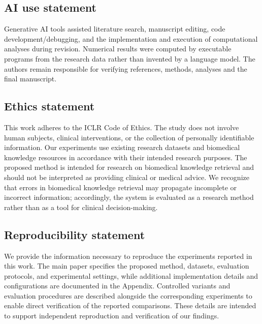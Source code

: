\documentclass{article} %
\begin{document}
\newpage
\subsection*{AI use statement}

Generative AI tools assisted literature search, manuscript editing, code development/debugging, and the implementation and execution of computational analyses during revision. Numerical results were computed by executable programs from the research data rather than invented by a language model. The authors remain responsible for verifying references, methods, analyses and the final manuscript.

\subsection*{Ethics statement}

This work adheres to the ICLR Code of Ethics. The study does not 
involve human subjects, clinical interventions, or the collection of 
personally identifiable information. Our experiments use existing 
research datasets and biomedical knowledge resources in accordance 
with their intended research purposes. The proposed method is intended 
for research on biomedical knowledge retrieval and should not be 
interpreted as providing clinical or medical advice. We recognize that 
errors in biomedical knowledge retrieval may propagate incomplete or 
incorrect information; accordingly, the system is evaluated as a 
research method rather than as a tool for clinical decision-making.

\subsection*{Reproducibility statement}

We provide the information necessary to reproduce the experiments 
reported in this work. The main paper specifies the proposed method, 
datasets, evaluation protocols, and experimental settings, while 
additional implementation details and configurations are documented 
in the Appendix. Controlled variants and evaluation procedures are 
described alongside the corresponding experiments to enable direct 
verification of the reported comparisons. These details are intended 
to support independent reproduction and verification of our findings.
\end{document}
